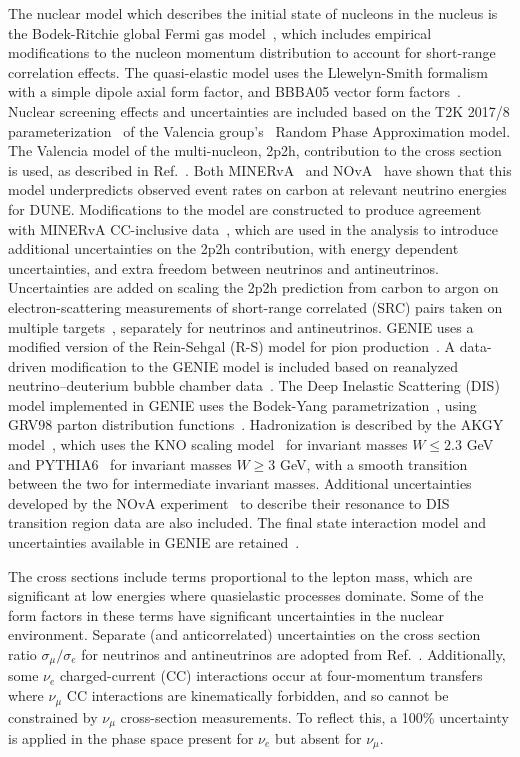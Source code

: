 The nuclear model which describes the initial state of nucleons in the nucleus is the Bodek-Ritchie global Fermi gas model~\cite{BodekRitchie}, which includes empirical modifications to the nucleon momentum distribution to account for short-range correlation effects. The quasi-elastic model uses the Llewelyn-Smith formalism~\cite{llewelyn-smith} with a simple dipole axial form factor, and BBBA05 vector form factors~\cite{bbba05}. Nuclear screening effects and uncertainties are included based on the T2K 2017/8 parameterization~\cite{Abe:2018wpn} of the Valencia group's~\cite{nieves1,nieves2} Random Phase Approximation model. The Valencia model of the multi-nucleon, 2p2h, contribution to the cross section~\cite{nieves1,nieves2} is used, as described in Ref.~\cite{Schwehr:2016pvn}. Both MINERvA~\cite{Rodrigues:2015hik} and NOvA~\cite{NOvA:2018gge} have shown that this model underpredicts observed event rates on carbon at relevant neutrino energies for DUNE. Modifications to the model are constructed to produce agreement with MINERvA CC-inclusive data~\cite{Rodrigues:2015hik}, which are used in the analysis to introduce additional uncertainties on the 2p2h contribution, with energy dependent uncertainties, and extra freedom between neutrinos and antineutrinos. Uncertainties are added on scaling the 2p2h prediction from carbon to argon on electron-scattering measurements of short-range correlated (SRC) pairs taken on multiple targets~\cite{Colle:2015ena}, separately for neutrinos and antineutrinos. GENIE uses a modified version of the Rein-Sehgal (R-S) model for pion production~\cite{Rein:1980wg}. A data-driven modification to the GENIE model is included based on reanalyzed neutrino--deuterium bubble chamber data~\cite{Wilkinson:2014yfa,Rodrigues:2016xjj}. The Deep Inelastic Scattering (DIS) model implemented in GENIE uses the Bodek-Yang parametrization~\cite{Bodek:2002ps}, using GRV98 parton distribution functions~\cite{Gluck:1998xa}. Hadronization is described by the AKGY model~\cite{Yang:2009zx}, which uses the KNO scaling model~\cite{Koba:1972ng} for invariant masses $W \leq 2.3$ GeV and PYTHIA6~\cite{Sjostrand:2006za} for invariant masses $W \geq 3$ GeV, with a smooth transition between the two for intermediate invariant masses. Additional uncertainties developed by the NOvA experiment~\cite{nova_2018} to describe their resonance to DIS transition region data are also included. The final state interaction model and uncertainties available in GENIE are retained~\cite{Dytman:2011zz,Dytman:2015taa,intranuke_2009}.

The cross sections include terms proportional to the lepton mass, which are significant at low energies where quasielastic processes dominate. Some of the form factors in these terms have significant uncertainties in the nuclear environment. Separate (and anticorrelated) uncertainties on the cross section ratio $\sigma_\mu/\sigma_e$ for neutrinos and antineutrinos are adopted from Ref.~\cite{Day:2012gb}. Additionally, some $\nu_e$ charged-current (CC) interactions occur at four-momentum transfers where $\nu_\mu$ CC interactions are kinematically forbidden, and so cannot be constrained by $\nu_\mu$ cross-section measurements. To reflect this, a 100\% uncertainty is applied in the phase space present for $\nu_e$ but absent for $\nu_\mu$.

